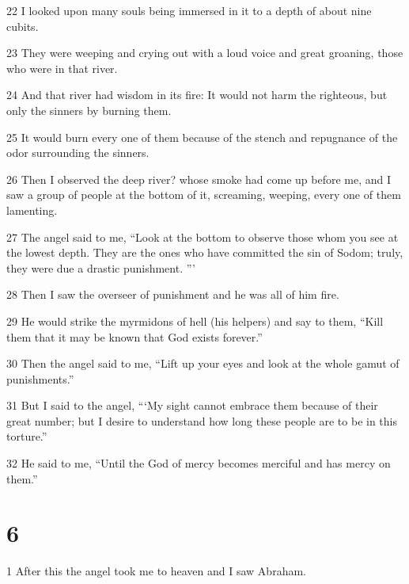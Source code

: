 \par 22 I looked upon many souls being immersed in it to a depth of about nine cubits. 

\par 23 They were weeping and crying out with a loud voice and great groaning, those who were in that river. 

\par 24 And that river had wisdom in its fire: It would not harm the righteous, but only the sinners by burning them. 

\par 25 It would burn every one of them because of the stench and repugnance of the odor surrounding the sinners. 

\par 26 Then I observed the deep river? whose smoke had come up before me, and I saw a group of people at the bottom of it, screaming, weeping, every one of them lamenting. 

\par 27 The angel said to me, “Look at the bottom to observe those whom you see at the lowest depth. They are the ones who have committed the sin of Sodom; truly, they were due a drastic punishment. ”’ 

\par 28 Then I saw the overseer of punishment and he was all of him fire. 

\par 29 He would strike the myrmidons of hell (his helpers) and say to them, “Kill them that it may be known that God exists forever.” 

\par 30 Then the angel said to me, “Lift up your eyes and look at the whole gamut of punishments.” 

\par 31 But I said to the angel, “‘My sight cannot embrace them because of their great number; but I desire to understand how long these people are to be in this torture.” 

\par 32 He said to me, “Until the God of mercy becomes merciful and has mercy on them.”

\chapter{6}

\par 1 After this the angel took me to heaven and I saw Abraham. 

